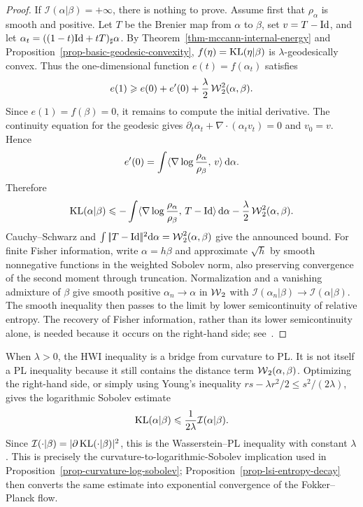 \begin{proof}
	If $\mathcal I(\alpha|\beta)=+\infty$, there is nothing to prove. Assume first that $\rho_\alpha$ is smooth and positive. Let $T$ be the Brenier map from $\alpha$ to $\beta$, set $v=T-\mathrm{Id}$, and let $\alpha_t=((1-t)\mathrm{Id}+tT)_\sharp\alpha$. By Theorem~\ref{thm-mccann-internal-energy} and Proposition~\ref{prop-basic-geodesic-convexity}, $f(\eta)=\operatorname{KL}(\eta|\beta)$ is $\lambda$-geodesically convex. Thus the one-dimensional function $e(t)=f(\alpha_t)$ satisfies
	\[
		e(1)\geqslant e(0)+e'(0)+\frac{\lambda}{2}\operatorname{\mathcal{W}}_2^2(\alpha,\beta).
	\]
	Since $e(1)=f(\beta)=0$, it remains to compute the initial derivative. The continuity equation for the geodesic gives $\partial_t\alpha_t+\nabla\cdot(\alpha_t v_t)=0$ and $v_0=v$. Hence
	\[
		e'(0)
		=
		\int \langle \nabla\log\frac{\rho_\alpha}{\rho_\beta},\,v\rangle\,\mathrm{d}\alpha.
	\]
	Therefore
	\[
		\operatorname{KL}(\alpha|\beta)
		\leqslant
		-\int \langle \nabla\log\frac{\rho_\alpha}{\rho_\beta},\,T-\mathrm{Id}\rangle\,\mathrm{d}\alpha
		-\frac{\lambda}{2}\operatorname{\mathcal{W}}_2^2(\alpha,\beta).
	\]
	Cauchy--Schwarz and $\int|\!| T-\mathrm{Id} |\!|^2\mathrm{d}\alpha=\operatorname{\mathcal{W}}_2^2(\alpha,\beta)$ give the announced bound. For finite Fisher information, write $\alpha=h\beta$ and approximate $\sqrt h$ by smooth nonnegative functions in the weighted Sobolev norm, also preserving convergence of the second moment through truncation. Normalization and a vanishing admixture of $\beta$ give smooth positive $\alpha_n\to\alpha$ in $\operatorname{\mathcal{W}}_2$ with $\mathcal I(\alpha_n|\beta)\to\mathcal I(\alpha|\beta)$. The smooth inequality then passes to the limit by lower semicontinuity of relative entropy. The recovery of Fisher information, rather than its lower semicontinuity alone, is needed because it occurs on the right-hand side; see~\cite{OttoVillani2000Generalization}.
\end{proof}

When \(\lambda>0\), the HWI inequality is a bridge from curvature to PL\@. It is not itself a PL inequality because it still contains the distance term \(\operatorname{\mathcal{W}}_2(\alpha,\beta)\). Optimizing the right-hand side, or simply using Young's inequality \(rs-\lambda r^2/2\leq s^2/(2\lambda)\), gives the logarithmic Sobolev estimate
\[
	\operatorname{KL}(\alpha|\beta)
	\leqslant
	\frac{1}{2\lambda}\mathcal I(\alpha|\beta).
\]
Since \(\mathcal I(\cdot|\beta)=|\partial\operatorname{KL}(\cdot|\beta)|^2\), this is the Wasserstein--PL inequality with constant \(\lambda\). This is precisely the curvature-to-logarithmic-Sobolev implication used in Proposition~\ref{prop-curvature-log-sobolev}; Proposition~\ref{prop-lsi-entropy-decay} then converts the same estimate into exponential convergence of the Fokker--Planck flow.

